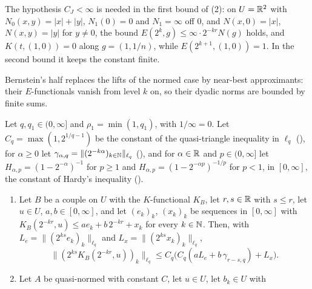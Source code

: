 The hypothesis $C_J < \infty$ is needed in the first bound of (2): on $U = \mathbb{R}^2$ with
$N_0(x, y) = |x| + |y|$, $N_1(0) = 0$ and $N_1 = \infty$ off $0$, and $N(x, 0) = |x|$,
$N(x, y) = |y|$ for $y \neq 0$, the bound $E(2^k, g) \leq \infty \cdot 2^{-kr} N(g)$ holds, and
$K(t, (1, 0)) = 0$ along $g = (1, 1/n)$, while $E(2^{k+1}, (1, 0)) = 1$. In the second bound it
keeps the constant finite.

Bernstein's half replaces the lifts of the normed case by near-best approximants: their
$E$-functionals vanish from level $k$ on, so their dyadic norms are bounded by finite sums.

\begin{theorem}
\label{thm:e-couple-bernstein}
\leanok
{}
Let $q, q_1 \in (0, \infty]$ and $\rho_1 = \min(1, q_1)$, with $1/\infty = 0$. Let
$C_q = \max(1, 2^{1/q - 1})$ be the constant of the quasi-triangle inequality in $\ell_q$
(), for $\alpha \geq 0$ let
$\gamma_{\alpha, q} = \|(2^{-k\alpha})_{k \in \mathbb{N}}\|_{\ell_q}$ (), and for
$\alpha \in \mathbb{R}$ and $p \in (0, \infty]$ let $H_{\alpha, p} = (1 - 2^{-\alpha})^{-1}$ for
$p \geq 1$ and $H_{\alpha, p} = (1 - 2^{-\alpha p})^{-1/p}$ for $p < 1$, in $[0, \infty]$, the
constant of Hardy's inequality ().
\begin{enumerate}
  \item Let $B$ be a couple on $U$ with the $K$-functional $K_B$, let $r, s \in \mathbb{R}$ with
    $s \leq r$, let $u \in U$, $a, b \in [0, \infty]$, and let $(e_k)_k$, $(x_k)_k$ be sequences
    in $[0, \infty]$ with $K_B(2^{-kr}, u) \leq a e_k + b \, 2^{-kr} + x_k$ for every $k \in \mathbb{N}$.
    Then, with $L_e = \|(2^{ks} e_k)_k\|_{\ell_q}$ and $L_x = \|(2^{ks} x_k)_k\|_{\ell_q}$,
    \[
      \|(2^{ks} K_B(2^{-kr}, u))_k\|_{\ell_q}
      \leq C_q \bigl( C_q ( a L_e + b \, \gamma_{r-s, q} ) + L_x \bigr) .
    \]
  \item Let $A$ be quasi-normed with constant $C$, let $u \in U$, let $b_k \in U$ with

\end{enumerate}
\end{theorem}
